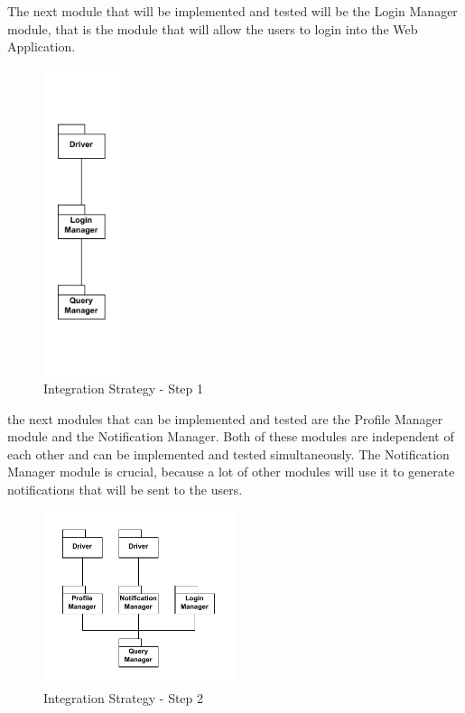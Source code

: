 \par The next module that will be implemented and tested will be the Login Manager module, that is the module that will
allow the users to login into the Web Application. 

\begin{figure}[H]
    \centering
    \includegraphics[width=0.2\textwidth]{Images/Integ_1.pdf}
    \caption{Integration Strategy - Step 1}
    \label{fig:integration-strategy-step-1}
\end{figure}

\par the next modules that can be implemented and tested are the Profile Manager module and the Notification Manager. 
Both of these modules are independent of each other and can be implemented and tested simultaneously.
The Notification Manager module is crucial, because a lot of other modules will use it to generate notifications that
will be sent to the users.

\begin{figure}[H]
    \centering
    \includegraphics[width=0.5\textwidth]{Images/Integ_2.pdf}
    \caption{Integration Strategy - Step 2}
    \label{fig:integration-strategy-step-2}
\end{figure}

